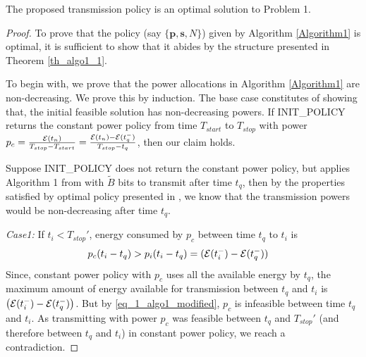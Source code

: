 \begin{theorem}
The proposed transmission policy is an optimal solution to Problem 1.
\label{th_algo1_2}
\end{theorem}
\begin{proof}
To prove that the policy (say $\{\textbf{p},\textbf{s},N\}$) given by Algorithm \ref{Algorithm1} is optimal, it is sufficient to show that it abides by the structure presented in Theorem \ref{th_algo1_1}.

To begin with, we prove that the power allocations in Algorithm \ref{Algorithm1} are non-decreasing. We prove this by induction. The base case constitutes of showing that, the initial feasible solution has non-decreasing powers. If INIT\_POLICY returns the constant power policy from time $T_{start}$ to $T_{stop}$ with power $p_c=\frac{\mathcal{E}(t_n)}{T_{stop}-T_{start}}=\frac{\mathcal{E}(t_n)-\mathcal{E}(t_q^-)}{T_{stop}-t_q}$, then our claim holds. 

Suppose INIT\_POLICY does not return the constant power policy, but applies Algorithm 1 from \cite{Yang} with $\widetilde{B}$ bits to transmit after time $t_q$, then by the properties satisfied by optimal policy presented in \cite{Yang}, we know that the transmission powers would be non-decreasing after time $t_q$.%

\textit{Case1:} If $t_i<T_{stop}'$, energy consumed by $p_c$ between time $t_q$ to $t_i$ is 
\begin{align}
&p_c(t_i-t_q)>p_i(t_i-t_q)=(\ETx(t_i^-)-\ETx(t_q^-))\label{eq_1_algo1_modified}
\end{align}
Since, constant power policy with $p_c$ uses all the available energy by $t_q$, the maximum amount of energy available for transmission between $t_q$ and $t_i$ is $\left(\mathcal{E}(t_i^-)-\mathcal{E}(t_q^-)\right)$. But by \eqref{eq_1_algo1_modified}, $p_c$ is infeasible between time $t_q$ and $t_i$. As transmitting with power $p_c$ was feasible between $t_q$ and $T_{stop}'$ (and therefore between $t_q$ and $t_i$) in constant power policy, we reach a contradiction.        


\end{proof}
